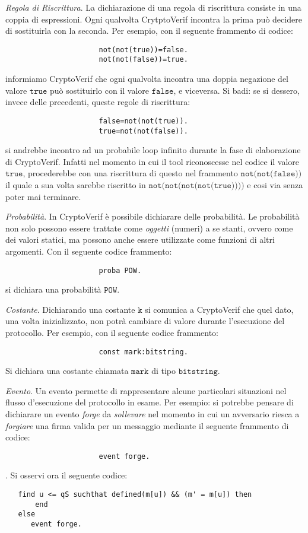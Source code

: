 \documentclass[a4paper,openright,twoside,12pt]{report}
\begin{document}
\begin{description}
 \item{\emph{Regola di Riscrittura}.} La dichiarazione di una regola di riscrittura consiste in una coppia di espressioni. Ogni qualvolta CrytptoVerif incontra la prima
			      pu\`o decidere di sostituirla con la seconda. Per esempio, con il seguente frammento di codice:
      				      \begin{verbatim}
				      not(not(true))=false.
				      not(not(false))=true.
				      \end{verbatim}
informiamo CryptoVerif che ogni qualvolta incontra una doppia negazione del valore $\texttt{true}$ pu\`o sostituirlo con il valore $\texttt{false}$, e viceversa. 
Si badi: se si dessero, invece delle precedenti, queste regole di riscrittura:
				      \begin{verbatim}
				      false=not(not(true)).
				      true=not(not(false)).
				      \end{verbatim}
si andrebbe incontro ad un probabile loop infinito durante la fase di elaborazione di CryptoVerif. Infatti nel momento in cui il tool riconoscesse nel codice il valore $\texttt{true}$, 
procederebbe con una riscrittura di questo nel frammento $\texttt{not(not(false))}$ il quale a sua volta sarebbe riscritto in $\texttt{not(not(not(not(true))))}$ e cosi via senza poter mai terminare.
 \item{\emph{Probabilit\`a}.} In CryptoVerif \`e possibile dichiarare delle probabilit\`a. Le probabilit\`a non solo possono essere trattate come \emph{oggetti} (numeri) 
		      a se stanti, ovvero come dei valori statici, ma possono anche essere utilizzate come funzioni di altri argomenti. Con il seguente codice frammento:
				      \begin{verbatim}
				      proba POW.
				      \end{verbatim}
si dichiara una probabilit\`a $\texttt{POW}$. 
 \item{\emph{Costante}.} Dichiarando una costante $\texttt{k}$ si comunica a CryptoVerif che quel dato, una volta inizializzato, non potr\`a cambiare di valore durante l'esecuzione del protocollo. Per esempio, con il seguente codice frammento:
				      \begin{verbatim}
				      const mark:bitstring.
				      \end{verbatim}
	Si dichiara una costante chiamata $\texttt{mark}$ di tipo $\texttt{bitstring}$.
 \item{\emph{Evento}.} Un evento permette di rappresentare alcune particolari situazioni nel flusso d'esecuzione del protocollo in esame. 
		Per esempio: si potrebbe
		pensare di dichiarare un evento \emph{forge} da \emph{sollevare} nel momento in cui un avversario riesca a \emph{forgiare} una firma
		valida per un messaggio mediante il seguente frammento di codice:
				      \begin{verbatim}
				      event forge.
				      \end{verbatim} .
	      Si osservi ora il seguente codice: 
 				      \begin{verbatim}
   find u <= qS suchthat defined(m[u]) && (m' = m[u]) then 
       end
   else      
      event forge.


\end{verbatim}
\end{description}
\end{document}
